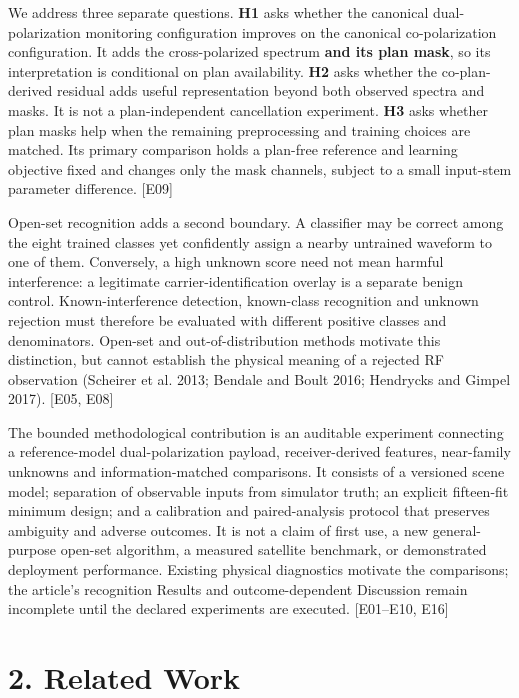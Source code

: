 \documentclass[
  10pt,
]{article}
\begin{document}
We address three separate questions. \textbf{H1} asks whether the
canonical dual-polarization monitoring configuration improves on the
canonical co-polarization configuration. It adds the cross-polarized
spectrum \textbf{and its plan mask}, so its interpretation is
conditional on plan availability. \textbf{H2} asks whether the
co-plan-derived residual adds useful representation beyond both observed
spectra and masks. It is not a plan-independent cancellation experiment.
\textbf{H3} asks whether plan masks help when the remaining
preprocessing and training choices are matched. Its primary comparison
holds a plan-free reference and learning objective fixed and changes
only the mask channels, subject to a small input-stem parameter
difference. {[}E09{]}

Open-set recognition adds a second boundary. A classifier may be correct
among the eight trained classes yet confidently assign a nearby
untrained waveform to one of them. Conversely, a high unknown score need
not mean harmful interference: a legitimate carrier-identification
overlay is a separate benign control. Known-interference detection,
known-class recognition and unknown rejection must therefore be
evaluated with different positive classes and denominators. Open-set and
out-of-distribution methods motivate this distinction, but cannot
establish the physical meaning of a rejected RF observation (Scheirer et
al. 2013; Bendale and Boult 2016; Hendrycks and Gimpel 2017). {[}E05,
E08{]}

The bounded methodological contribution is an auditable experiment
connecting a reference-model dual-polarization payload, receiver-derived
features, near-family unknowns and information-matched comparisons. It
consists of a versioned scene model; separation of observable inputs
from simulator truth; an explicit fifteen-fit minimum design; and a
calibration and paired-analysis protocol that preserves ambiguity and
adverse outcomes. It is not a claim of first use, a new general-purpose
open-set algorithm, a measured satellite benchmark, or demonstrated
deployment performance. Existing physical diagnostics motivate the
comparisons; the article's recognition Results and outcome-dependent
Discussion remain incomplete until the declared experiments are
executed. {[}E01--E10, E16{]}

\section{2. Related Work}\label{related-work}
\end{document}
